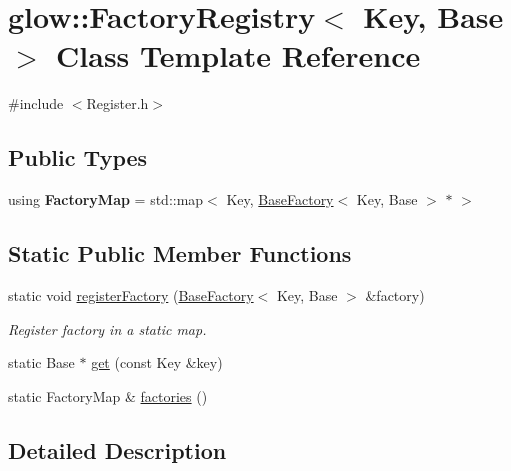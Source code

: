 \hypertarget{classglow_1_1_factory_registry}{}\section{glow\+:\+:Factory\+Registry$<$ Key, Base $>$ Class Template Reference}
\label{classglow_1_1_factory_registry}


{\ttfamily \#include $<$Register.\+h$>$}

\subsection*{Public Types}
\begin{DoxyCompactItemize}
\item 
\mbox{\label{classglow_1_1_factory_registry_a20511cc66b6f3a12e4833b4c565f5f0f}} 
using {\bfseries Factory\+Map} = std\+::map$<$ Key, \hyperlink{classglow_1_1_base_factory}{Base\+Factory}$<$ Key, Base $>$ $\ast$ $>$
\end{DoxyCompactItemize}
\subsection*{Static Public Member Functions}
\begin{DoxyCompactItemize}
\item 
\mbox{\label{classglow_1_1_factory_registry_a9278f0f5491b29ebf3b4603b639a8335}} 
static void \hyperlink{classglow_1_1_factory_registry_a9278f0f5491b29ebf3b4603b639a8335}{register\+Factory} (\hyperlink{classglow_1_1_base_factory}{Base\+Factory}$<$ Key, Base $>$ \&factory)
\begin{DoxyCompactList}\small\item\em Register {\ttfamily factory} in a static map. \end{DoxyCompactList}\item 
static Base $\ast$ \hyperlink{classglow_1_1_factory_registry_a47327249d018b64fdba09cc525e338ca}{get} (const Key \&key)
\item 
static Factory\+Map \& \hyperlink{classglow_1_1_factory_registry_a9f52e9f03175b729d272d8587ad9c259}{factories} ()
\end{DoxyCompactItemize}


\subsection{Detailed Description}
